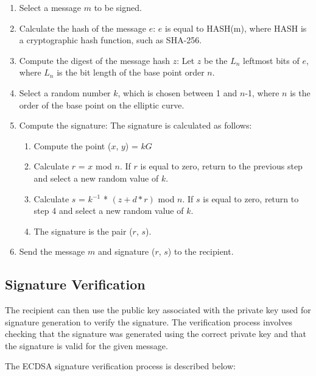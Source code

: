 \documentclass[main\_\_EN.tex]{subfiles}
\begin{document}
\begin{enumerate}
    \item Select a message $m$ to be signed.
    \item Calculate the hash of the message $e$: $e$ is equal to HASH(m), where HASH is a cryptographic hash function, such as SHA-256.
    \item Compute the digest of the message hash $z$: Let $z$ be the $L_n$ leftmost bits of $e$, where $L_n$ is the bit length of the base point order $n$.
    \item Select a random number $k$, which is chosen between 1 and $n$-1, where $n$ is the order of the base point on the elliptic curve.
    \item Compute the signature: The signature is calculated as follows:
          \begin{enumerate}
              \item Compute the point ($x$, $y$) = $kG$
              \item Calculate $r$ = $x$ mod $n$. If $r$ is equal to zero, return to the previous step and select a new random value of $k$.
              \item Calculate $s$ = $k$$^{-1}$ * $(z + d*r)$  \textrm{mod} $n$. If $s$ is equal to zero, return to step 4 and select a new random value of $k$.
              \item The signature is the pair ($r$, $s$).
          \end{enumerate}
    \item Send the message $m$ and signature ($r$, $s$) to the recipient.
\end{enumerate}

\subsection{Signature Verification}

The recipient can then use the public key associated with the private key used for signature generation to verify the signature. The verification process involves checking that the signature was generated using the correct private key and that the signature is valid for the given message.

The ECDSA signature verification process is described below:
\end{document}

